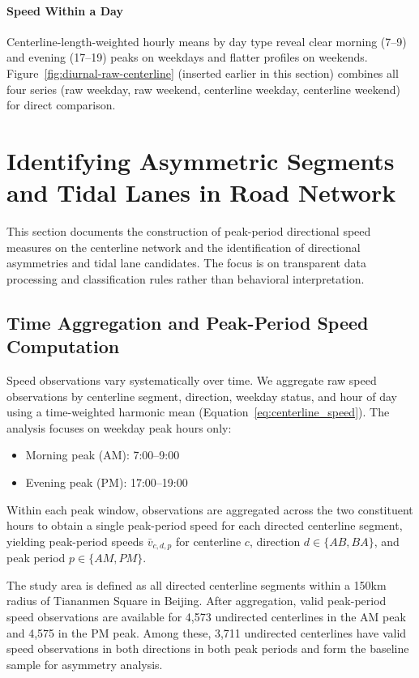 \documentclass[12pt]{article}
\begin{document}
	\paragraph{Speed Within a Day}
	
	Centerline-length-weighted hourly means by day type reveal clear morning (7--9) and evening (17--19) peaks on weekdays and flatter profiles on weekends. Figure~\ref{fig:diurnal-raw-centerline} (inserted earlier in this section) combines all four series (raw weekday, raw weekend, centerline weekday, centerline weekend) for direct comparison.
	
	\clearpage

	
	\section{Identifying Asymmetric Segments and Tidal Lanes in Road Network}
	\label{sec:asym_sec}
	This section documents the construction of peak-period directional speed measures on the centerline network and the identification of directional asymmetries and tidal lane candidates. The focus is on transparent data processing and classification rules rather than behavioral interpretation.
	
	\subsection{Time Aggregation and Peak-Period Speed Computation}
	
	Speed observations vary systematically over time. We aggregate raw speed observations by centerline segment, direction, weekday status, and hour of day using a time-weighted harmonic mean (Equation~\eqref{eq:centerline_speed}). The analysis focuses on weekday peak hours only:
	\begin{itemize}
		\item Morning peak (AM): 7:00--9:00
		\item Evening peak (PM): 17:00--19:00
	\end{itemize}
	Within each peak window, observations are aggregated across the two constituent hours to obtain a single peak-period speed for each directed centerline segment, yielding peak-period speeds $\bar{v}_{c,d,p}$ for centerline $c$, direction $d \in \{AB, BA\}$, and peak period $p \in \{AM, PM\}$.
	
	The study area is defined as all directed centerline segments within a 150km radius of Tiananmen Square in Beijing. After aggregation, valid peak-period speed observations are available for 4,573 undirected centerlines in the AM peak and 4,575 in the PM peak. Among these, 3,711 undirected centerlines have valid speed observations in both directions in both peak periods and form the baseline sample for asymmetry analysis.
	
\end{document}
